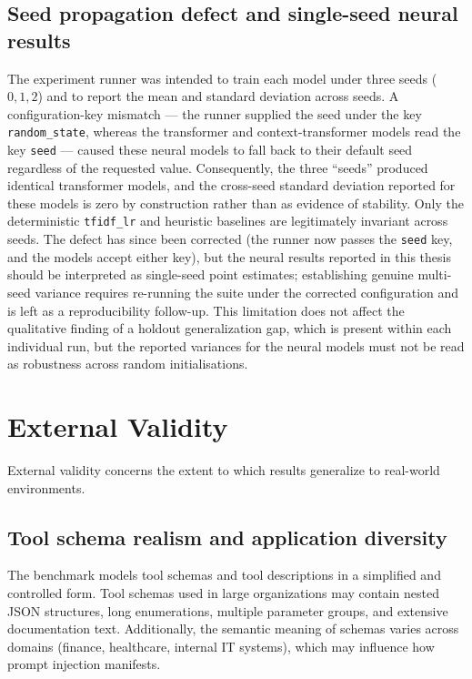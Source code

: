 \subsection{Seed propagation defect and single-seed neural results}
The experiment runner was intended to train each model under three seeds ($0, 1, 2$) and to report the mean and standard deviation across seeds. A configuration-key mismatch --- the runner supplied the seed under the key \texttt{random\_state}, whereas the transformer and context-transformer models read the key \texttt{seed} --- caused these neural models to fall back to their default seed regardless of the requested value. Consequently, the three ``seeds'' produced identical transformer models, and the cross-seed standard deviation reported for these models is zero by construction rather than as evidence of stability. Only the deterministic \texttt{tfidf\_lr} and heuristic baselines are legitimately invariant across seeds. The defect has since been corrected (the runner now passes the \texttt{seed} key, and the models accept either key), but the neural results reported in this thesis should be interpreted as single-seed point estimates; establishing genuine multi-seed variance requires re-running the suite under the corrected configuration and is left as a reproducibility follow-up. This limitation does not affect the qualitative finding of a holdout generalization gap, which is present within each individual run, but the reported variances for the neural models must not be read as robustness across random initialisations.

\section{External Validity}
\label{subsec:external_validity}

External validity concerns the extent to which results generalize to real-world environments.

\subsection{Tool schema realism and application diversity}
The benchmark models tool schemas and tool descriptions in a simplified and controlled form. Tool schemas used in large organizations may contain nested JSON structures, long enumerations, multiple parameter groups, and extensive documentation text. Additionally, the semantic meaning of schemas varies across domains (finance, healthcare, internal IT systems), which may influence how prompt injection manifests.

